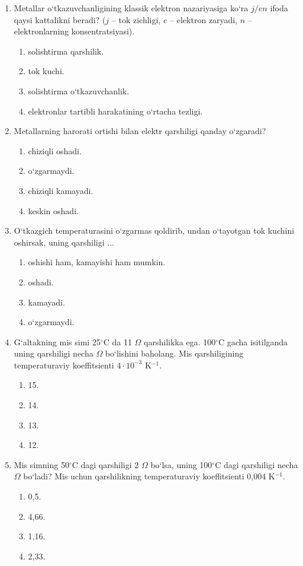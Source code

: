 \begin{enumerate}
\item Metallar o‘tkazuvchanligining klassik elektron nazariyasiga ko‘ra $j/en$ ifoda qaysi kattalikni beradi? ($j$ – tok zichligi, $e$ – elektron zaryadi, $n$ – elektronlarning konsentratsiyasi).
\begin{enumerate}[label=\Alph*)]
\item solishtirma qarshilik.
\item tok kuchi.
\item solishtirma o‘tkazuvchanlik.
\item elektronlar tartibli harakatining o‘rtacha tezligi.
\end{enumerate}

\item Metallarning harorati ortishi bilan elektr qarshiligi qanday o‘zgaradi?
\begin{enumerate}[label=\Alph*)]
\item chiziqli oshadi.
\item o‘zgarmaydi.
\item chiziqli kamayadi.
\item keskin oshadi.
\end{enumerate}

\item O‘tkazgich temperaturasini o‘zgarmas qoldirib, undan o‘tayotgan tok kuchini oshirsak, uning qarshiligi ...
\begin{enumerate}[label=\Alph*)]
\item oshishi ham, kamayishi ham mumkin.
\item oshadi.
\item kamayadi.
\item o‘zgarmaydi.
\end{enumerate}


\item G‘altakning mis simi 25$^\circ$C da 11 $\Omega$ qarshilikka ega. 100$^\circ$C gacha isitilganda uning qarshiligi necha $\Omega$ bo‘lishini baholang. Mis qarshiligining temperaturaviy koeffitsienti $4 \cdot 10^{-3}$ K$^{-1}$.
\begin{enumerate}[label=\Alph*)]
\item 15.
\item 14.
\item 13.
\item 12.
\end{enumerate}

\item Mis simning 50$^\circ$C dagi qarshiligi 2 $\Omega$ bo‘lsa, uning 100$^\circ$C dagi qarshiligi necha $\Omega$ bo‘ladi? Mis uchun qarshilikning temperaturaviy koeffitsienti 0,004 K$^{-1}$.
\begin{enumerate}[label=\Alph*)]
\item 0,5.
\item 4,66.
\item 1,16.
\item 2,33.
\end{enumerate}


\end{enumerate}
